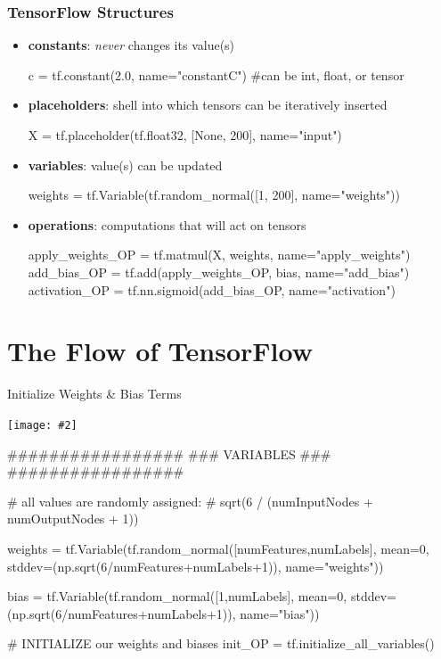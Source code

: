 \documentclass[14pt]{beamer}
\newcommand {\framedgraphic}[2] { %
    \begin{frame}{#1}
        \begin{center}
            \texttt{[image: \#2]}
        \end{center}
    \end{frame}
}
\begin{document}
\begin{frame}[fragile]
\frametitle{TensorFlow Structures}
\begin{itemize}
\item{\textbf{constants}}: {\small \textit{never} changes its value(s)} \\
\begin{python}
c = tf.constant(2.0, name="constantC") #can be int, float, or tensor
\end{python}
\item{\textbf{placeholders}}: {\small shell into which tensors can be iteratively inserted} \\
\begin{python}
X = tf.placeholder(tf.float32, [None, 200], name="input")
\end{python}
\item{\textbf{variables}}: {\small value(s) can be updated}
\begin{python}
weights = tf.Variable(tf.random_normal([1, 200], name="weights"))
\end{python}
\item{\textbf{operations}}: {\small computations that will act on tensors}
\begin{python}
apply_weights_OP = tf.matmul(X, weights, name="apply_weights")
add_bias_OP = tf.add(apply_weights_OP, bias, name="add_bias")
activation_OP = tf.nn.sigmoid(add_bias_OP, name="activation")\end{python}
\end{itemize}
\end{frame}

\section{The Flow of TensorFlow}



\framedgraphic{Initialize Weights \& Bias Terms}{1-initialization.png}

\begin{frame}[fragile]
  \begin{python}
#################
### VARIABLES ###
#################

# all values are randomly assigned:
# sqrt(6 / (numInputNodes + numOutputNodes + 1))

weights = tf.Variable(tf.random_normal([numFeatures,numLabels],
          mean=0,
          stddev=(np.sqrt(6/numFeatures+numLabels+1)),
          name="weights"))

bias = tf.Variable(tf.random_normal([1,numLabels],
       mean=0,
       stddev=(np.sqrt(6/numFeatures+numLabels+1)),
       name="bias"))


# INITIALIZE our weights and biases
init_OP = tf.initialize_all_variables()
  \end{python}
\end{frame}
\end{document}
